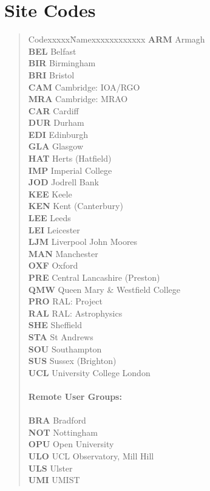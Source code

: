 \newpage

\section{\label{sitecodes}Site Codes}

\begin{quote}
\begin{tabbing}
Codexxxxx\=Namexxxxxxxxxxxx\kill
{\bf ARM} \> Armagh \\
{\bf BEL} \> Belfast \\
{\bf BIR} \> Birmingham \\
{\bf BRI} \> Bristol \\
{\bf CAM} \> Cambridge: IOA/RGO \\
{\bf MRA} \> Cambridge: MRAO \\
{\bf CAR} \> Cardiff \\
{\bf DUR} \> Durham \\
{\bf EDI} \> Edinburgh \\
{\bf GLA} \> Glasgow \\
{\bf HAT} \> Herts (Hatfield) \\
{\bf IMP} \> Imperial College \\
{\bf JOD} \> Jodrell Bank \\
{\bf KEE} \> Keele \\
{\bf KEN} \> Kent (Canterbury) \\
{\bf LEE} \> Leeds \\
{\bf LEI} \> Leicester \\
{\bf LJM} \> Liverpool John Moores \\
{\bf MAN} \> Manchester \\
{\bf OXF} \> Oxford \\
{\bf PRE} \> Central Lancashire (Preston) \\
{\bf QMW} \> Queen Mary \& Westfield College \\
{\bf PRO} \> RAL: Project \\
{\bf RAL} \> RAL: Astrophysics \\
{\bf SHE} \> Sheffield \\
{\bf STA} \> St Andrews \\
{\bf SOU} \> Southampton \\
{\bf SUS} \> Sussex (Brighton) \\
{\bf UCL} \> University College London \\
\\
{\bf Remote User Groups:} \\
\\
{\bf BRA} \> Bradford \\
{\bf NOT} \> Nottingham \\
{\bf OPU} \> Open University \\
{\bf ULO} \> UCL Observatory, Mill Hill\\
{\bf ULS} \> Ulster\\
{\bf UMI} \> UMIST
\end{tabbing}
\end{quote}

